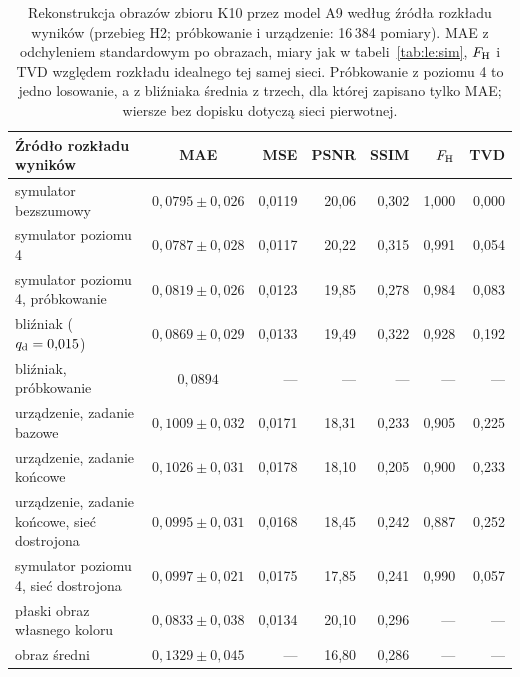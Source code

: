 \begin{table}[htbp]
\centering
\caption[Rekonstrukcja obrazów zbioru K10 na symulatorach i na urządzeniu]{Rekonstrukcja obrazów zbioru K10 przez model A9 według źródła rozkładu wyników (przebieg H2; próbkowanie i urządzenie: 16\,384 pomiary). MAE z odchyleniem standardowym po obrazach, miary jak w tabeli~\ref{tab:le:sim}, $F_{\mathrm{H}}$ i TVD względem rozkładu idealnego tej samej sieci. Próbkowanie z poziomu 4 to jedno losowanie, a z bliźniaka średnia z trzech, dla której zapisano tylko MAE; wiersze bez dopisku dotyczą sieci pierwotnej.}
\label{tab:le:hw}
\footnotesize
\setlength{\tabcolsep}{4.5pt}
\begin{tabular}{@{}lcrrrrr@{}}
\toprule
Źródło rozkładu wyników & MAE & MSE & PSNR & SSIM & $F_{\mathrm{H}}$ & TVD \\
\midrule
symulator bezszumowy & $0{,}0795\pm0{,}026$ & 0,0119 & 20,06 & 0,302 & 1,000 & 0,000 \\
symulator poziomu 4 & $0{,}0787\pm0{,}028$ & 0,0117 & 20,22 & 0,315 & 0,991 & 0,054 \\
symulator poziomu 4, próbkowanie & $0{,}0819\pm0{,}026$ & 0,0123 & 19,85 & 0,278 & 0,984 & 0,083 \\
bliźniak ($q_{\mathrm{d}}=0{,}015$) & $0{,}0869\pm0{,}029$ & 0,0133 & 19,49 & 0,322 & 0,928 & 0,192 \\
bliźniak, próbkowanie & $0{,}0894$\phantom{${}\pm0{,}000$} & --- & --- & --- & --- & --- \\
urządzenie, zadanie bazowe & $0{,}1009\pm0{,}032$ & 0,0171 & 18,31 & 0,233 & 0,905 & 0,225 \\
\midrule
urządzenie, zadanie końcowe & $0{,}1026\pm0{,}031$ & 0,0178 & 18,10 & 0,205 & 0,900 & 0,233 \\
urządzenie, zadanie końcowe, sieć dostrojona & $0{,}0995\pm0{,}031$ & 0,0168 & 18,45 & 0,242 & 0,887 & 0,252 \\
symulator poziomu 4, sieć dostrojona & $0{,}0997\pm0{,}021$ & 0,0175 & 17,85 & 0,241 & 0,990 & 0,057 \\
\midrule
płaski obraz własnego koloru & $0{,}0833\pm0{,}038$ & 0,0134 & 20,10 & 0,296 & --- & --- \\
obraz średni & $0{,}1329\pm0{,}045$ & --- & 16,80 & 0,286 & --- & --- \\
\bottomrule
\end{tabular}
\end{table}

